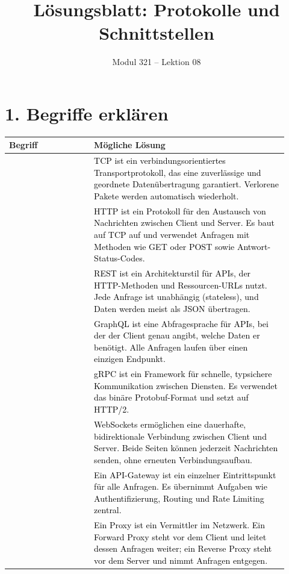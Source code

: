 \documentclass[11pt,a4paper]{article}
\title{\textbf{Lösungsblatt: Protokolle und Schnittstellen}}
\author{Modul 321 -- Lektion 08}
\date{}
\newcommand{\term}[1]{\fcolorbox{black!20}{teal!8}{\strut #1}}
\newcommand{\solution}[1]{\textcolor{black}{#1}}
\begin{document}
\maketitle


\section*{1. Begriffe erklären}
\begin{longtable}{|>{\raggedright\arraybackslash}p{0.28\linewidth}|>{\raggedright\arraybackslash}p{0.64\linewidth}|}
\hline
\textbf{Begriff} & \textbf{Mögliche Lösung} \\
\hline
\term{TCP} &
\solution{TCP ist ein verbindungsorientiertes Transportprotokoll, das eine zuverlässige und geordnete Datenübertragung garantiert. Verlorene Pakete werden automatisch wiederholt.} \\ \hline
\term{HTTP} &
\solution{HTTP ist ein Protokoll für den Austausch von Nachrichten zwischen Client und Server. Es baut auf TCP auf und verwendet Anfragen mit Methoden wie GET oder POST sowie Antwort-Status-Codes.} \\ \hline
\term{REST} &
\solution{REST ist ein Architekturstil für APIs, der HTTP-Methoden und Ressourcen-URLs nutzt. Jede Anfrage ist unabhängig (stateless), und Daten werden meist als JSON übertragen.} \\ \hline
\term{GraphQL} &
\solution{GraphQL ist eine Abfragesprache für APIs, bei der der Client genau angibt, welche Daten er benötigt. Alle Anfragen laufen über einen einzigen Endpunkt.} \\ \hline
\term{gRPC} &
\solution{gRPC ist ein Framework für schnelle, typsichere Kommunikation zwischen Diensten. Es verwendet das binäre Protobuf-Format und setzt auf HTTP/2.} \\ \hline
\term{WebSocket} &
\solution{WebSockets ermöglichen eine dauerhafte, bidirektionale Verbindung zwischen Client und Server. Beide Seiten können jederzeit Nachrichten senden, ohne erneuten Verbindungsaufbau.} \\ \hline
\term{Gateway} &
\solution{Ein API-Gateway ist ein einzelner Eintrittspunkt für alle Anfragen. Es übernimmt Aufgaben wie Authentifizierung, Routing und Rate Limiting zentral.} \\ \hline
\term{Proxy} &
\solution{Ein Proxy ist ein Vermittler im Netzwerk. Ein Forward Proxy steht vor dem Client und leitet dessen Anfragen weiter; ein Reverse Proxy steht vor dem Server und nimmt Anfragen entgegen.} \\ \hline
\end{longtable}
\end{document}
